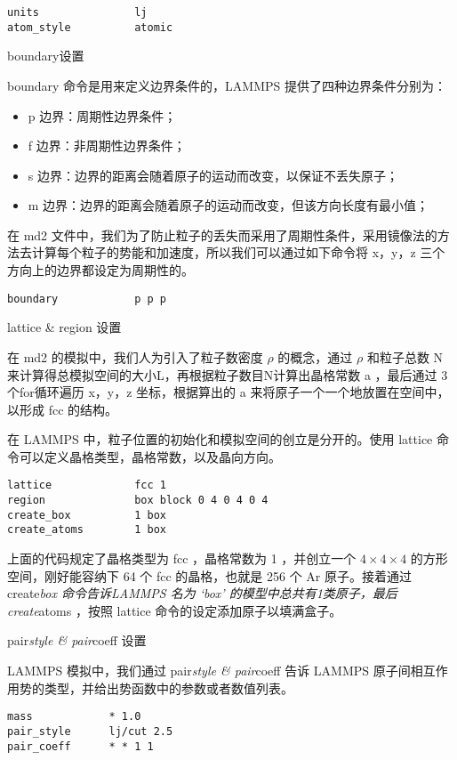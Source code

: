 \documentclass[
]{article}
\begin{document}
\begin{verbatim}
units				lj
atom_style			atomic
\end{verbatim}

boundary设置

boundary 命令是用来定义边界条件的，LAMMPS 提供了四种边界条件分别为：

\begin{itemize}
\item
  p 边界：周期性边界条件；
\item
  f 边界：非周期性边界条件；
\item
  s 边界：边界的距离会随着原子的运动而改变，以保证不丢失原子；
\item
  m 边界：边界的距离会随着原子的运动而改变，但该方向长度有最小值；
\end{itemize}

在 md2
文件中，我们为了防止粒子的丢失而采用了周期性条件，采用镜像法的方法去计算每个粒子的势能和加速度，所以我们可以通过如下命令将
x，y，z 三个方向上的边界都设定为周期性的。

\begin{verbatim}
boundary			p p p
\end{verbatim}

lattice \& region 设置

在 md2 的模拟中，我们人为引入了粒子数密度 \(\rho\) 的概念，通过 \(\rho\)
和粒子总数 N 来计算得总模拟空间的大小L，再根据粒子数目N计算出晶格常数 a
，最后通过 3 个for循环遍历 x，y，z 坐标，根据算出的 a
来将原子一个一个地放置在空间中，以形成 fcc 的结构。

在 LAMMPS 中，粒子位置的初始化和模拟空间的创立是分开的。使用 lattice
命令可以定义晶格类型，晶格常数，以及晶向方向。

\begin{verbatim}
lattice     		fcc 1
region      		box block 0 4 0 4 0 4
create_box  		1 box
create_atoms		1 box
\end{verbatim}

上面的代码规定了晶格类型为 fcc ，晶格常数为 1 ，并创立一个
\(4 × 4 × 4 \) 的方形空间，刚好能容纳下 64 个 fcc 的晶格，也就是 256 个
Ar 原子。接着通过 create\emph{box 命令告诉LAMMPS 名为 `box'
的模型中总共有1类原子，最后 create}atoms ，按照 lattice
命令的设定添加原子以填满盒子。

pair\emph{style \& pair}coeff 设置

LAMMPS 模拟中，我们通过 pair\emph{style \& pair}coeff 告诉 LAMMPS
原子间相互作用势的类型，并给出势函数中的参数或者数值列表。

\begin{verbatim}
mass      		* 1.0
pair_style		lj/cut 2.5
pair_coeff		* * 1 1
\end{verbatim}
\end{document}
